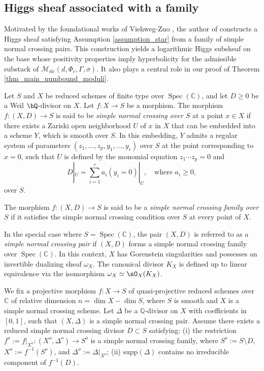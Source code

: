 \documentclass[11pt,letterpaper]{amsart}
\numberwithin{equation}{section}
\begin{document}
\subsection{Higgs sheaf associated with a family}
Motivated by the foundational works of Viehweg-Zuo \cite{VZ2001,VZ2003}, the author of \cite{stjc2025} constructs a Higgs sheaf satisfying Assumption \ref{assumption_star} from a family of simple normal crossing pairs. This construction yields a logarithmic Higgs subsheaf on the base whose positivity properties imply hyperbolicity for the admissible substack of $\overline{\mathcal{M}}_{\mathrm{slc}}(d, \Phi_c, \Gamma, \sigma)$. It also plays a central role in our proof of Theorem \ref{thm_main_numbound_moduli}.
\begin{defn}\label{defn_SNC_family}
	Let $S$ and $X$ be reduced schemes of finite type over $\operatorname{Spec}(\mathbb{C})$, and let $D \geq 0$ be a Weil $\bQ$-divisor on $X$. Let $f: X \to S$ be a morphism. The morphism $f: (X, D) \to S$ is said to be \emph{simple normal crossing over $S$} at a point $x \in X$ if there exists a Zariski open neighborhood $U$ of $x$ in $X$ that can be embedded into a scheme $Y$, which is smooth over $S$. In this embedding, $Y$ admits a regular system of parameters $(z_1, \dots, z_p, y_1, \dots, y_r)$ over $S$ at the point corresponding to $x = 0$, such that $U$ is defined by the monomial equation $z_1 \cdots z_p = 0$ and  
	\[ D|_U = \sum_{i=1}^r a_i (y_i = 0)|_U, \quad \text{where } a_i \geq 0, \]  
	over $S$.
	
	The morphism $f: (X, D) \to S$ is said to be a \emph{simple normal crossing family over $S$} if it satisfies the simple normal crossing condition over $S$ at every point of $X$. 
	
	In the special case where $S = \operatorname{Spec}(\mathbb{C})$, the pair $(X, D)$ is referred to as a \emph{simple normal crossing pair} if $(X, D)$ forms a simple normal crossing family over $\operatorname{Spec}(\mathbb{C})$. In this context, $X$ has Gorenstein singularities and possesses an invertible dualizing sheaf $\omega_X$. The canonical divisor $K_X$ is defined up to linear equivalence via the isomorphism $\omega_X \simeq \sO_X(K_X)$.
\end{defn}
We fix a projective morphism $f \colon X \to S$ of quasi-projective reduced schemes over $\mathbb{C}$ of relative dimension $n = \dim X - \dim S$, where $S$ is smooth and $X$ is a simple normal crossing scheme. Let $\Delta$ be a $\mathbb{Q}$-divisor on $X$ with coefficients in $[0,1]$, such that $(X,\Delta)$ is a simple normal crossing pair. Assume there exists a reduced simple normal crossing divisor $D \subset S$ satisfying:  
(i) the restriction $f^o := f|_{X^o} \colon (X^o, \Delta^o) \to S^o$ is a simple normal crossing family, where $S^o := S \setminus D$, $X^o := f^{-1}(S^o)$, and $\Delta^o := \Delta|_{X^o}$;  
(ii) $\mathrm{supp}(\Delta)$ contains no irreducible component of $f^{-1}(D)$.  
\end{document}
